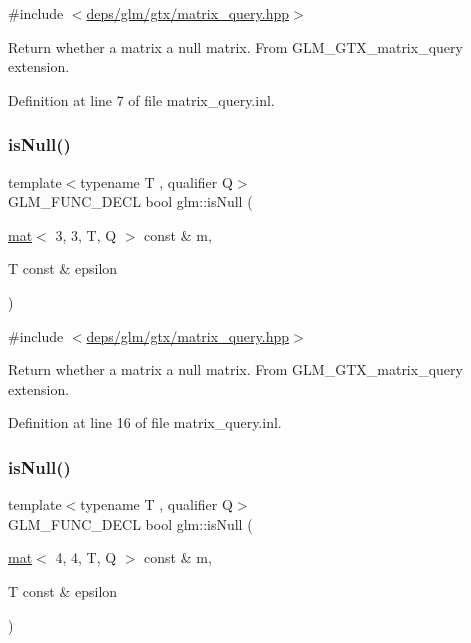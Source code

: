 {\ttfamily \#include $<$\hyperlink{matrix__query_8hpp}{deps/glm/gtx/matrix\+\_\+query.\+hpp}$>$}

Return whether a matrix a null matrix. From G\+L\+M\+\_\+\+G\+T\+X\+\_\+matrix\+\_\+query extension. 

Definition at line 7 of file matrix\+\_\+query.\+inl.

\mbox{\label{group__gtx__matrix__query_gae14501c6b14ccda6014cc5350080103d}} 
\subsubsection{\texorpdfstring{is\+Null()}{isNull()}\hspace{0.1cm}{\footnotesize\ttfamily [2/3]}}
{\footnotesize\ttfamily template$<$typename T , qualifier Q$>$ \\
G\+L\+M\+\_\+\+F\+U\+N\+C\+\_\+\+D\+E\+CL bool glm\+::is\+Null (\begin{DoxyParamCaption}\item[{\hyperlink{structglm_1_1mat}{mat}$<$ 3, 3, T, Q $>$ const \&}]{m,  }\item[{T const \&}]{epsilon }\end{DoxyParamCaption})}



{\ttfamily \#include $<$\hyperlink{matrix__query_8hpp}{deps/glm/gtx/matrix\+\_\+query.\+hpp}$>$}

Return whether a matrix a null matrix. From G\+L\+M\+\_\+\+G\+T\+X\+\_\+matrix\+\_\+query extension. 

Definition at line 16 of file matrix\+\_\+query.\+inl.

\mbox{\label{group__gtx__matrix__query_ga2b98bb30a9fefa7cdea5f1dcddba677b}} 
\subsubsection{\texorpdfstring{is\+Null()}{isNull()}\hspace{0.1cm}{\footnotesize\ttfamily [3/3]}}
{\footnotesize\ttfamily template$<$typename T , qualifier Q$>$ \\
G\+L\+M\+\_\+\+F\+U\+N\+C\+\_\+\+D\+E\+CL bool glm\+::is\+Null (\begin{DoxyParamCaption}\item[{\hyperlink{structglm_1_1mat}{mat}$<$ 4, 4, T, Q $>$ const \&}]{m,  }\item[{T const \&}]{epsilon }\end{DoxyParamCaption})}



